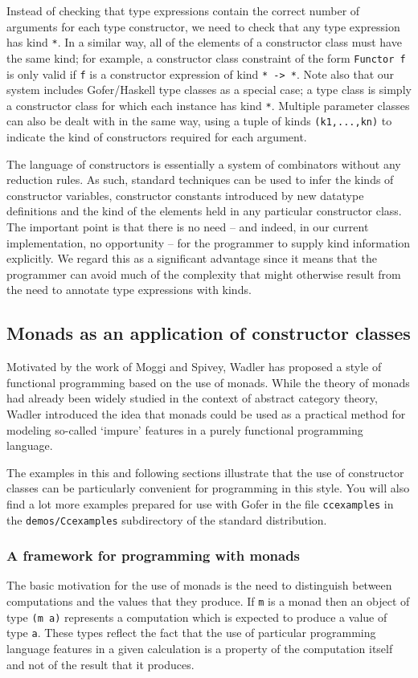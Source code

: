 Instead of checking that type expressions contain the correct number of
arguments for each type constructor, we need to check that any type
expression has kind \verb"*".  In a similar way, all of the elements of a
constructor class must have the same kind; for example, a constructor
class constraint of the form \verb"Functor f" is only valid if \verb"f" is a
constructor expression of kind \verb"* -> *".  Note also that our system
includes Gofer/Haskell type classes as a special case; a type class is
simply a constructor class for which each instance has kind \verb"*".  Multiple
parameter classes can also be dealt with in the same way, using a tuple
of kinds \verb"(k1,...,kn)" to indicate the kind of constructors required for
each argument.

The language of constructors is essentially a system of combinators
without any reduction rules.  As such, standard techniques can be
used to infer the kinds of constructor variables, constructor constants
introduced by new datatype definitions and the kind of the elements
held in any particular constructor class.  The important point is that
there is no need -- and indeed, in our current implementation, no
opportunity -- for the programmer to supply kind information
explicitly.  We regard this as a significant advantage since it means
that the programmer can avoid much of the complexity that might
otherwise result from the need to annotate type expressions with
kinds.


\subsection{Monads as an application of constructor classes}
Motivated by the work of Moggi and Spivey, Wadler has proposed a style
of functional programming based on the use of monads.  While the theory
of monads had already been widely studied in the context of abstract
category theory, Wadler introduced the idea that monads could be used
as a practical method for modeling so-called `impure' features in a
purely functional programming language.

The examples in this and following sections illustrate that the use of
constructor classes can be particularly convenient for programming in
this style.  You will also find a lot more examples prepared for use
with Gofer in the file \verb"ccexamples" in the \verb"demos/Ccexamples" subdirectory
of the standard distribution.


\subsubsection{A framework for programming with monads}
The basic motivation for the use of monads is the need to distinguish
between computations and the values that they produce.  If \verb"m" is a monad
then an object of type \verb"(m a)" represents a computation which is expected
to produce a value of type \verb"a".  These types reflect the fact that the
use of particular programming language features in a given calculation
is a property of the computation itself and not of the result that it
produces.

